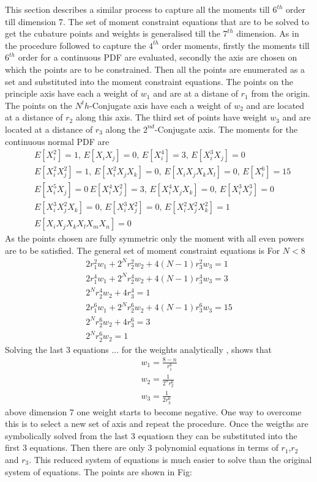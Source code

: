 \documentclass[letterpaper, 10 pt, conference]{ieeeconf}  %
\begin{document}
This section describes a similar process to capture all the moments till $6^{th}$ order till dimension 7. The set of moment constraint equations that are to be solved to get the cubature points and weights is generalised till the $7^{th}$ dimension. As in the procedure followed to capture the $4^{th}$ order moments, firstly the moments till $6^{th}$ order for a continuous PDF are evaluated, secondly the axis are chosen on which the points are to be constrained. Then all the points are enumerated as a set and substituted into the moment constraint equations. The points on the principle axis have each a weight of $w_1$ and are at a distane of $r_1$ from the origin. The points on the $N^th$-Conjugate axis have each a weight of $w_2$ and are located at a distance of $r_2$ along this axis. The third set of points have weight $w_3$ and are located at a distance of $r_3$ along the $2^{nd}$-Conjugate axis. The moments for the continuous normal PDF are    
\setlength{\arraycolsep}{0.0em}
\begin{eqnarray}
&E[X_i^2]=1,\, E[X_iX_j]=0, \, E[X_i^4]=3, \, E[X_i^3X_j]=0 \nonumber\\
&E[X_i^2X_j^2]=1, \, E[X_i^2X_jX_k]=0,\, E[X_iX_jX_kX_l]=0, \, E[X_i^6]=15\nonumber\\
&E[X_i^5X_j]=0 \, E[X_i^4X_j^2]=3,\, E[X_i^4X_jX_k]=0, \, E[X_i^3X_j^3]=0\nonumber\\
&E[X_i^3X_j^2X_k]=0, \, E[X_i^3X_j^2]=0,\,E[X_i^2X_j^2X_k^2]=1 \nonumber\\
&E[X_iX_jX_kX_lX_mX_n]=0\label{6thmoms}
\end{eqnarray}
\setlength{\arraycolsep}{5pt}
As the points chosen are fully symmetric only the moment with all even powers are to be satisfied. The general set of moment constraint equations is\newline
For $N<8$
\setlength{\arraycolsep}{0.0em}
\begin{eqnarray}
2r_1^2w_1+2^Nr_2^2w_2+4(N-1)r_3^2w_3=1\\
2r_1^4w_1+2^Nr_2^4w_2+4(N-1)r_3^4w_3=3\\
2^Nr_2^4w_2+4r_3^4=1\\
2r_1^6w_1+2^Nr_2^6w_2+4(N-1)r_3^6w_3=15\\
2^Nr_2^6w_2+4r_3^6=3\\
2^Nr_2^6w_2=1
\end{eqnarray}
\setlength{\arraycolsep}{5pt}
Solving the last 3 equations ...  for the weights analytically , shows that
 \setlength{\arraycolsep}{0.0em}
\begin{eqnarray}
w_1=\frac{8-n}{r_1^6}\\
w_2=\frac{1}{2^nr_2^6}\\
w_3=\frac{1}{2r_3^6}
\end{eqnarray}
\setlength{\arraycolsep}{5pt}
above dimension 7 one weight starts to become negative. One way to overcome this is to select a new set of axis and repeat the procedure. Once the weigths are symbolically solved from the last 3 equatiosn they can be substituted into the first 3 equations. Then there are only 3 polynomial equations in terms of $r_1$,$r_2$ and $r_3$. This reduced system of equations is much easier to solve than the original system of equations. The points are shown in Fig: 
\end{document}
